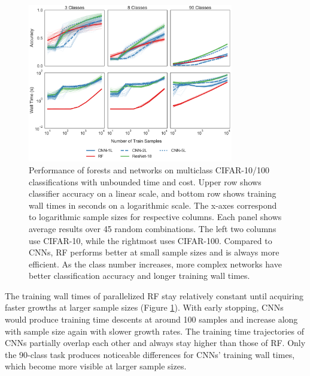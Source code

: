 \begin{figure}[htb]
\centering
\includegraphics[width=0.8\textwidth]{figures/cifar}
  \caption{Performance of forests and networks on multiclass CIFAR-10/100 classifications with unbounded time and cost.
  Upper row shows classifier accuracy on a linear scale, and bottom row shows training wall times in seconds on a logarithmic scale. The x-axes correspond to logarithmic sample sizes for respective columns. Each panel shows average results over 45 random combinations. The left two columns use CIFAR-10, while the rightmost uses CIFAR-100.
  Compared to CNNs, RF performs better at small sample sizes and is always more efficient. As the class number increases, more complex networks have better classification accuracy and longer training wall times.
  }
\label{fig:cifar}
\end{figure}

The training wall times of parallelized RF stay relatively constant until acquiring faster growths at larger sample sizes (Figure \ref{fig:cifar}). With early stopping, CNNs would produce training time descents at around 100 samples and increase along with sample size again with slower growth rates. The training time trajectories of CNNs partially overlap each other and always stay higher than those of RF. Only the 90-class task produces noticeable differences for CNNs' training wall times, which become more visible at larger sample sizes.


